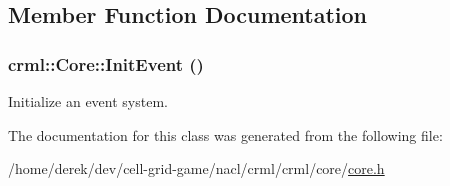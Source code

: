 \subsection{Member Function Documentation}
\hypertarget{classcrml_1_1_core_a9ecaf3f48d06f7f51be8f67767c7d3a3}{
\subsubsection[{InitEvent}]{\setlength{\rightskip}{0pt plus 5cm}crml::Core::InitEvent ()}}
\label{classcrml_1_1_core_a9ecaf3f48d06f7f51be8f67767c7d3a3}


Initialize an event system. 



The documentation for this class was generated from the following file:\begin{DoxyCompactItemize}
\item 
/home/derek/dev/cell-\/grid-\/game/nacl/crml/crml/core/\hyperlink{core_8h}{core.h}\end{DoxyCompactItemize}
